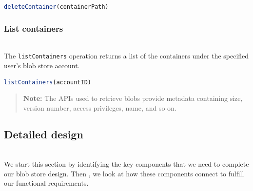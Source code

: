 \begin{lstlisting}[language=JavaScript]
deleteContainer(containerPath)
\end{lstlisting}

\begin{table}[htbp]
\centering
\small
{}
\end{table}

\subsubsection{List containers}\label{7yLrwdOLKV35Yr9aN0L6S}
\\
The \texttt{listContainers} operation returns a list of the containers under the specified user's blob store account.

\begin{lstlisting}[language=JavaScript]
listContainers(accountID)
\end{lstlisting}

\begin{table}[htbp]
\centering
\small
{}
\end{table}

\begin{quote}
\textbf{Note:} The APIs used to retrieve blobs provide metadata containing size, version number, access privileges, name, and so on.
\end{quote}
\subsection{Detailed design}\label{ljXYJrkelDWSWnKGfAMLh}
\\
We start this section by identifying the key components that we need to complete our blob store design. Then , we look at how these components connect to fulfill our functional requirements.

